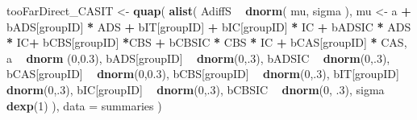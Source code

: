 \documentclass[10pt,dvipsnames,enabledeprecatedfontcommands]{scrartcl}
\newenvironment{Shaded}{\begin{snugshade}}{\end{snugshade}}
\newcommand{\KeywordTok}[1]{\textcolor[rgb]{0.13,0.29,0.53}{\textbf{#1}}}
\newcommand{\DataTypeTok}[1]{\textcolor[rgb]{0.13,0.29,0.53}{#1}}
\newcommand{\DecValTok}[1]{\textcolor[rgb]{0.00,0.00,0.81}{#1}}
\newcommand{\FloatTok}[1]{\textcolor[rgb]{0.00,0.00,0.81}{#1}}
\newcommand{\StringTok}[1]{\textcolor[rgb]{0.31,0.60,0.02}{#1}}
\newcommand{\OperatorTok}[1]{\textcolor[rgb]{0.81,0.36,0.00}{\textbf{#1}}}
\newcommand{\NormalTok}[1]{#1}
\begin{document}
\begin{Shaded}
\begin{Highlighting}[]
\NormalTok{tooFarDirect_CASIT <-}\StringTok{ }\KeywordTok{quap}\NormalTok{(}
  \KeywordTok{alist}\NormalTok{(}
\NormalTok{    AdiffS }\OperatorTok{~}\StringTok{ }\KeywordTok{dnorm}\NormalTok{( mu, sigma ),}
\NormalTok{    mu <-}\StringTok{ }\NormalTok{a }\OperatorTok{+}\StringTok{ }\NormalTok{bADS[groupID] }\OperatorTok{*}\StringTok{ }\NormalTok{ADS }\OperatorTok{+}\StringTok{  }\NormalTok{bIT[groupID] }\OperatorTok{+}\StringTok{ }\NormalTok{bIC[groupID] }\OperatorTok{*}\StringTok{ }\NormalTok{IC }\OperatorTok{+}\StringTok{ }
\StringTok{      }\NormalTok{bADSIC }\OperatorTok{*}\StringTok{ }\NormalTok{ADS }\OperatorTok{*}\StringTok{ }\NormalTok{IC}\OperatorTok{+}\StringTok{ }\NormalTok{bCBS[groupID] }\OperatorTok{*}\NormalTok{CBS }\OperatorTok{+}\StringTok{ }\NormalTok{bCBSIC }\OperatorTok{*}\StringTok{ }\NormalTok{CBS }\OperatorTok{*}\StringTok{ }\NormalTok{IC }\OperatorTok{+}\StringTok{ }\NormalTok{bCAS[groupID] }\OperatorTok{*}\StringTok{ }\NormalTok{CAS, }
\NormalTok{    a }\OperatorTok{~}\StringTok{ }\KeywordTok{dnorm}\NormalTok{ (}\DecValTok{0}\NormalTok{,}\FloatTok{0.3}\NormalTok{),}
\NormalTok{    bADS[groupID] }\OperatorTok{~}\StringTok{ }\KeywordTok{dnorm}\NormalTok{(}\DecValTok{0}\NormalTok{,.}\DecValTok{3}\NormalTok{),}
\NormalTok{    bADSIC }\OperatorTok{~}\StringTok{ }\KeywordTok{dnorm}\NormalTok{(}\DecValTok{0}\NormalTok{,.}\DecValTok{3}\NormalTok{),}
\NormalTok{    bCAS[groupID] }\OperatorTok{~}\StringTok{ }\KeywordTok{dnorm}\NormalTok{(}\DecValTok{0}\NormalTok{,}\FloatTok{0.3}\NormalTok{),}
\NormalTok{    bCBS[groupID] }\OperatorTok{~}\StringTok{ }\KeywordTok{dnorm}\NormalTok{(}\DecValTok{0}\NormalTok{,.}\DecValTok{3}\NormalTok{),}
\NormalTok{    bIT[groupID] }\OperatorTok{~}\StringTok{ }\KeywordTok{dnorm}\NormalTok{(}\DecValTok{0}\NormalTok{,.}\DecValTok{3}\NormalTok{),}
\NormalTok{    bIC[groupID] }\OperatorTok{~}\StringTok{ }\KeywordTok{dnorm}\NormalTok{(}\DecValTok{0}\NormalTok{,.}\DecValTok{3}\NormalTok{),}
\NormalTok{    bCBSIC }\OperatorTok{~}\StringTok{ }\KeywordTok{dnorm}\NormalTok{(}\DecValTok{0}\NormalTok{, }\FloatTok{.3}\NormalTok{),}
\NormalTok{    sigma  }\OperatorTok{~}\StringTok{ }\KeywordTok{dexp}\NormalTok{(}\DecValTok{1}\NormalTok{)}
\NormalTok{  ), }
  \DataTypeTok{data =}\NormalTok{ summaries}
\NormalTok{)}




\end{Highlighting}
\end{Shaded}
\end{document}
